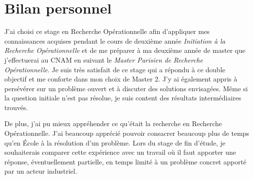 \chapter*{Bilan personnel}

J'ai choisi ce stage en Recherche Opérationnelle afin d'appliquer mes connaissances acquises pendant le cours de deuxième année \emph{Initiation à la Recherche Opérationnelle} et de me préparer à ma deuxième année de master que j'effectuerai au CNAM en suivant le \emph{Master Parisien de Recherche Opérationnelle}. Je suis très satisfait de ce stage qui a répondu à ce double objectif et me conforte dans mon choix de Master 2. J'y ai également appris à persévérer sur un problème ouvert et à discuter des solutions envisagées. Même si la question initiale n'est pas résolue, je suis content des résultats intermédiaires trouvés.

De plus, j'ai pu mieux appréhender ce qu'était la recherche en Recherche Opérationnelle. J'ai beaucoup apprécié pouvoir consacrer beaucoup plus de temps qu'en \'Ecole à la résolution d'un problème. Lors du stage de fin d'étude, je souhaiterais comparer cette expérience avec un travail où il faut apporter une réponse, éventuellement partielle, en temps limité à un problème concret apporté par un acteur industriel.
